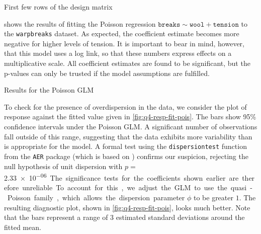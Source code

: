 \documentclass[titlepage]{article}
\begin{document}
\begin{table}[!htb]
  \centering
  
  \caption{First few rows of the design matrix}
  \label{tab:q4-design-mat}
\end{table}

 shows the results of fitting the Poisson regression $\texttt{breaks} \sim \texttt{wool} + \texttt{tension}$ to the \texttt{warpbreaks} dataset. As expected, the coefficient estimate becomes more negative for higher levels of tension. It is important to bear in mind, however, that this model uses a log link, so that these numbers express effects on a multiplicative scale. All coefficient estimates are found to be significant, but the p-values can only be trusted if the model assumptions are fulfilled.

\begin{table}[!htb]
  \centering
  
  \caption{Results for the Poisson GLM}
  \label{tab:q4-glm-res}
\end{table}

To check for the presence of overdispersion in the data, we consider the plot of response against the fitted value given in \cref{fig:q4-resp-fit-pois}. The bars show 95\% confidence intervals under the Poisson GLM. A significant number of observations fall outside of this range, suggesting that the data exhibits more variability than is appropriate for the model. A formal test using the \texttt{dispersiontest} function from the \texttt{AER} package \cite{aer} (which is based on \cite{cameron}) confirms our suspicion, rejecting the null hypothesis of unit dispersion with $p = $ \SI{2.33e-06}. The significance tests for the coefficients shown earlier are therefore unreliable.

To account for this, we adjust the GLM to use the quasi-Poisson family, which allows the dispersion parameter $\phi$ to be greater $1$. The resulting diagnostic plot, shown in \cref{fig:q4-resp-fit-pois}, looks much better. Note that the bars represent a range of $3$ estimated standard deviations around the fitted mean.
\end{document}
